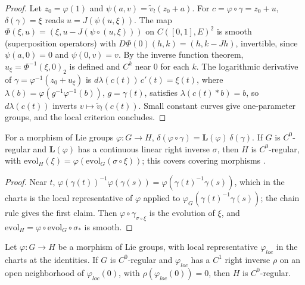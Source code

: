 \begin{proof}
  \leanok
  Let $z_0 = \varphi(1)$ and $\psi(a, v) = \tilde v_l(z_0 + a)$. For $c = \varphi\circ\gamma = z_0 + u$,
  $\delta(\gamma) = \xi$ reads $u = J(\psi(u, \xi))$. The map
  $\Phi(\xi, u) = (\xi, u - J(\psi\circ(u, \xi)))$ on $C([0, 1], E)^2$ is smooth (superposition
  operators) with $D\Phi(0)(h, k) = (h, k - Jh)$, invertible, since $\psi(a, 0) = 0$ and
  $\psi(0, v) = v$. By the inverse function theorem, $u_\xi = \Phi^{-1}(\xi, 0)_2$ is defined and
  $C^k$ near $0$ for each $k$. The logarithmic derivative of $\gamma = \varphi^{-1}(z_0 + u_\xi)$
  is $d\lambda(c(t))\,c'(t) = \xi(t)$, where $\lambda(b) = \varphi(g^{-1}\varphi^{-1}(b))$,
  $g = \gamma(t)$, satisfies $\lambda(c(t) * b) = b$, so $d\lambda(c(t))$ inverts
  $v \mapsto \tilde v_l(c(t))$. Small constant curves give one-parameter groups, and the local
  criterion concludes.
\end{proof}

\begin{proposition}
  \label{prop:regular-hom}
  \leanok
  For a morphism of Lie groups $\varphi\colon G \to H$, $\delta(\varphi\circ\gamma) =
  \mathbf{L}(\varphi)\,\delta(\gamma)$. If $G$ is $C^0$-regular and $\mathbf{L}(\varphi)$ has a
  continuous linear right inverse $\sigma$, then $H$ is $C^0$-regular, with
  $\mathrm{evol}_H(\xi) = \varphi(\mathrm{evol}_G(\sigma\circ\xi))$; this covers covering
  morphisms \cite[Proposition 6.1.5]{GN26}.
\end{proposition}

\begin{proof}
  \leanok
  Near $t$, $\varphi(\gamma(t))^{-1}\varphi(\gamma(s)) = \varphi(\gamma(t)^{-1}\gamma(s))$, which in
  the charts is the local representative of $\varphi$ applied to $\varphi_G(\gamma(t)^{-1}\gamma(s))$;
  the chain rule gives the first claim. Then $\varphi\circ\gamma_{\sigma\circ\xi}$ is the evolution of
  $\xi$, and $\mathrm{evol}_H = \varphi\circ\mathrm{evol}_G\circ\sigma_*$ is smooth.
\end{proof}

\begin{lemma}
  \label{lem:regular-hom-right-inverse}
  \leanok
  Let $\varphi\colon G \to H$ be a morphism of Lie groups, with local representative
  $\varphi_{loc}$ in the charts at the identities. If $G$ is $C^0$-regular and $\varphi_{loc}$ has a
  $C^1$ right inverse $\rho$ on an open neighborhood of $\varphi_{loc}(0)$, with
  $\rho(\varphi_{loc}(0)) = 0$, then $H$ is $C^0$-regular.
\end{lemma}


